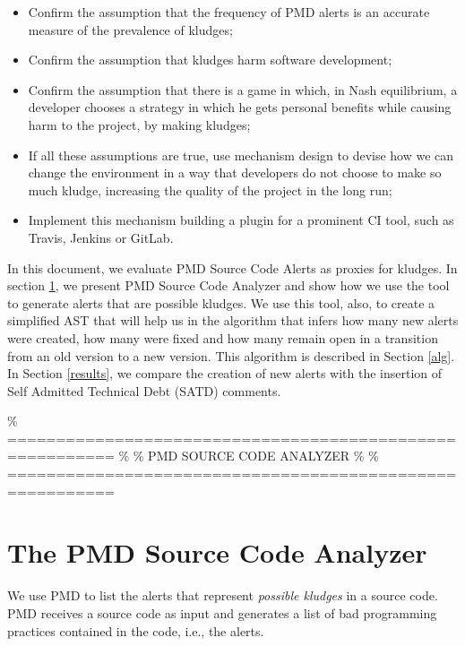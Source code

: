 \documentclass[
]{article}
\begin{document}
\begin{itemize}
\item
  Confirm the assumption that the frequency of PMD alerts is an accurate
  measure of the prevalence of kludges;
  
\item
  Confirm the assumption that kludges harm software development;

\item
  Confirm the assumption that there is a game in which, in Nash
  equilibrium, a developer chooses a strategy in which he gets personal
  benefits while causing harm to the project, by making kludges;

\item
  If all these assumptions are true, use mechanism design to devise how
  we can change the environment in a way that developers do not choose
  to make so much kludge, increasing the quality of the project in the
  long run;

\item
  Implement this mechanism building a plugin for a prominent CI tool,
  such as Travis, Jenkins or GitLab.
\end{itemize}

In this document, we evaluate PMD Source Code Alerts as proxies for
kludges. In section \ref{pmd}, we present PMD Source Code Analyzer and
show how we use the tool to generate alerts that are possible kludges.
We use this tool, also, to create a simplified AST that will help us in
the algorithm that infers how many new alerts were created, how many
were fixed and how many remain open in a transition from an old version
to a new version. This algorithm is described in Section \ref{alg}. In
Section \ref{results}, we compare the creation of new alerts with the
insertion of Self Admitted Technical Debt (SATD) comments.

\% ========================================================= \% \% PMD
SOURCE CODE ANALYZER \% \%
=========================================================

\section{The PMD Source Code Analyzer}\label{pmd}

We use PMD to list the alerts that represent \textit{possible kludges}
in a source code. PMD receives a source code as input and generates a
list of bad programming practices contained in the code, i.e., the
alerts.
\end{document}
